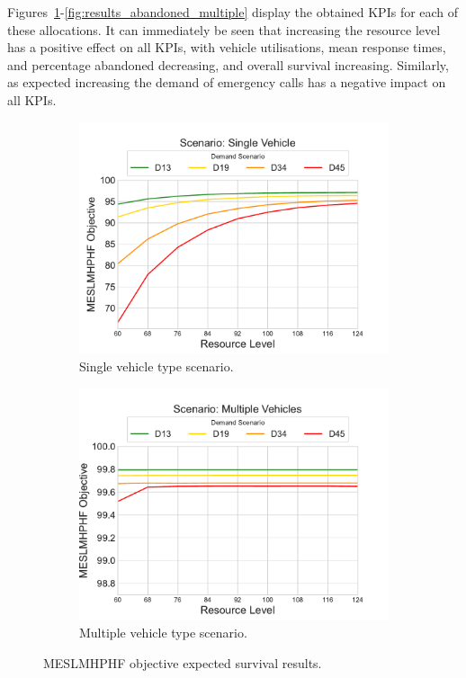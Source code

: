 \documentclass[preprint,12pt]{elsarticle}
\begin{document}
Figures~\ref{fig:results_objective_single}-\ref{fig:results_abandoned_multiple}
display the obtained KPIs for each of these allocations. It can immediately be
seen that increasing the resource level has a positive effect on all KPIs,
with vehicle utilisations, mean response times, and percentage abandoned
decreasing, and overall survival increasing. Similarly, as expected increasing
the demand of emergency calls has a negative impact on all KPIs.

\begin{figure}
\begin{center}
\begin{subfigure}{0.43\textwidth}
\includegraphics[width=\textwidth]{img/results/single_Objective}
\caption{Single vehicle type scenario.}
\label{fig:results_objective_single}
\end{subfigure}
\begin{subfigure}{0.43\textwidth}
\includegraphics[width=\textwidth]{img/results/multiple_Objective}
\caption{Multiple vehicle type scenario.}
\label{fig:results_objective_multiple}
\end{subfigure}
\end{center}
\caption{MESLMHPHF objective expected survival results.}
\label{fig:results_objective}
\end{figure}
\end{document}

